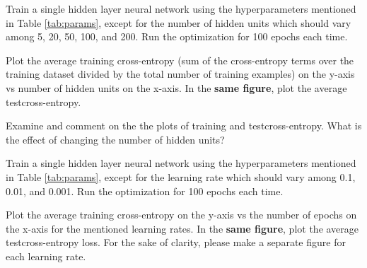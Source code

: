 \documentclass[11pt]{exam}
\numberwithin{equation}{section} %
\numberwithin{figure}{section} %
\numberwithin{table}{section} %
\newcommand{\ntset}{test}
\begin{document}
\begin{questions}
\setcounter{enumi}{4}
\question[4]  %
Train a single hidden layer neural network using the hyperparameters mentioned in Table \ref{tab:params}, except for the number of hidden units which should vary among 5, 20, 50, 100, and 200.  Run the optimization for 100 epochs each time.

Plot the average training cross-entropy (sum of the cross-entropy terms over the training dataset divided by the total number of training examples) on the y-axis vs number of hidden units on the x-axis. In the \textbf{same figure}, plot the average \ntset \thinspace cross-entropy.

 \begin{tcolorbox}[fit,height=10cm, width=15cm, blank, borderline={1pt}{-2pt}]
 \end{tcolorbox}



\clearpage
\question[1]
Examine and comment on the the plots of training and \ntset\thinspace cross-entropy. What is the effect of changing the number of hidden units?

 \begin{tcolorbox}[fit,height=8cm, width=15cm, blank, borderline={1pt}{-2pt}]
    \end{tcolorbox}





\clearpage
\question[4] %
Train a single hidden layer neural network using the hyperparameters mentioned in Table \ref{tab:params}, except for the learning rate which should vary among 0.1, 0.01, and 0.001. Run the optimization for 100 epochs each time.

Plot the average training cross-entropy on the y-axis vs the number of epochs on the x-axis for the mentioned learning rates. In the \textbf{same figure}, plot the average \ntset\thinspace cross-entropy loss. For the sake of clarity, please make a separate figure for each learning rate.


\end{questions}
\end{document}
